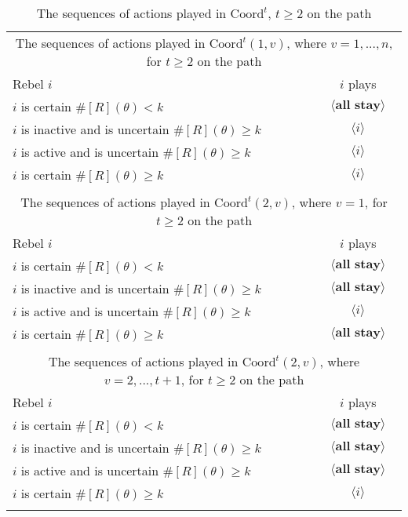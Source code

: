 \documentclass[12pt,letter]{article}
\newcommand{\Kappa}{\mathrm{Coord}}
\theoremstyle{definition}
\theoremstyle{remark}
\theoremstyle{claim}
\begin{document}
\begin{table}[!htbp]
\caption{The sequences of actions played in $\Kappa^t$, $t\geq 2$ on the path}
\label{Table_cdt}
\begin{center}
\begin{tabular}{l c}
\multicolumn{2}{c}{The sequences of actions played in $\Kappa^t(1,v)$, where $v=1,...,n$, for $t\geq 2$ on the path}\\
Rebel $i$ 	 	&  	$i$ plays		 \\
\hline
\hline
$i$ is certain $\#[R](\theta)<k$ 	& 	$\langle \textbf{all stay} \rangle$	\\
$i$ is inactive and is uncertain $\#[R](\theta)\geq k$	& 	$\langle i \rangle$	\\
$i$ is active and is uncertain $\#[R](\theta)\geq k$ &  $\langle i \rangle$  \\
$i$ is certain $\#[R](\theta)\geq k$ &  $\langle i \rangle$  \\
\hline
\\
\multicolumn{2}{c}{The sequences of actions played in $\Kappa^t(2,v)$, where $v=1$, for $t\geq 2$ on the path}\\
Rebel $i$ 	 	&  	$i$ plays		 \\
\hline
\hline
$i$ is certain $\#[R](\theta)<k$ 	& 	$\langle \textbf{all stay} \rangle$	\\
$i$ is inactive and is uncertain $\#[R](\theta)\geq k$	& 	$\langle \textbf{all stay} \rangle$	\\
$i$ is active and is uncertain $\#[R](\theta)\geq k$ &  $\langle i \rangle$  \\
$i$ is certain $\#[R](\theta)\geq k$ &  $\langle \textbf{all stay} \rangle$  \\
\hline
\\
\multicolumn{2}{c}{The sequences of actions played in $\Kappa^t(2,v)$, where $v=2,...,t+1$, for $t\geq 2$ on the path}\\
Rebel $i$ 	 	&  	$i$ plays		 \\
\hline
\hline
$i$ is certain $\#[R](\theta)<k$ 	& 	$\langle \textbf{all stay} \rangle$	\\
$i$ is inactive and is uncertain $\#[R](\theta)\geq k$	& 	$\langle \textbf{all stay} \rangle$	\\
$i$ is active and is uncertain $\#[R](\theta)\geq k$ &  $\langle \textbf{all stay} \rangle$  \\
$i$ is certain $\#[R](\theta)\geq k$ &  $\langle i \rangle$  \\
\hline
\\

\end{tabular}
\end{center}
\end{table}
\end{document}
